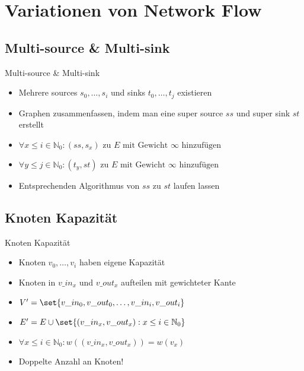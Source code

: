 \section{Variationen von Network Flow}
\subsection{Multi-source \& Multi-sink}
\begin{frame}{Multi-source \& Multi-sink}
    \begin{itemize}
        \pause\item Mehrere sources $s_0,\dots,s_i$ und sinks $t_0,\dots,t_j$ existieren
        \pause\item Graphen zusammenfassen, indem man eine super source $ss$ und super sink
        $st$ erstellt
        \pause\item \(\forall x \leq i \in \mathbb{N}_0 : (ss, s_x) \text{ zu $E$ mit
        Gewicht $\infty$ hinzufügen}\)
        \item \(\forall y \leq j \in \mathbb{N}_0 : (t_y, st) \text{ zu $E$ mit
        Gewicht $\infty$ hinzufügen}\)
        \pause\item Entsprechenden Algorithmus von $ss$ zu $st$ laufen lassen
    \end{itemize}
\end{frame}

\subsection{Knoten Kapazität}
\begin{frame}{Knoten Kapazität}
    \begin{itemize}
        \pause\item Knoten $v_0,\dots,v_i$ haben eigene Kapazität
        \pause\item Knoten in $v\_in_x$ und $v\_out_x$ aufteilen mit gewichteter Kante
        \pause\item \(V' = \set{v\_in_0, v\_out_0, \dots, v\_in_i, v\_out_i}\)
        \pause\item \(E' = E \cup \set{(v\_in_x, v\_out_x) : x \leq i \in \mathbb{N}_0}\)
        \pause\item \(\forall x \leq i \in \mathbb{N}_0 : w((v\_in_x, v\_out_x)) = w(v_x)\)
        \pause\item Doppelte Anzahl an Knoten!
    \end{itemize}
\end{frame}

